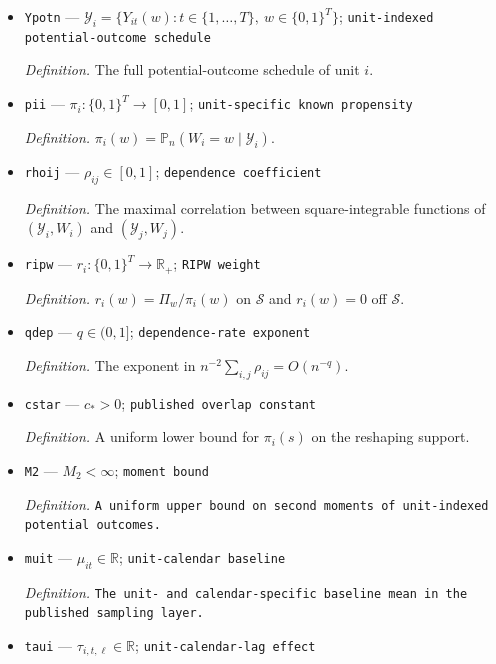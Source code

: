\documentclass{article}
\begin{document}
\begin{itemize}
  \par\smallskip\noindent\emph{Definition.} The observed outcome path of unit \(i\), with \(Y_{it}=Y_{it}(W_i)\).
  \item \texttt{Ypotn} --- \(\mathscr Y_i=\{Y_{it}(w):t\in\{1,\ldots,T\},\ w\in\{0,1\}^{T}\}\); \texttt{unit-\allowbreak{}indexed potential-\allowbreak{}outcome schedule}
  \par\smallskip\noindent\emph{Definition.} The full potential-outcome schedule of unit \(i\).
  \item \texttt{pii} --- \(\pi_i:\{0,1\}^{T}\to[0,1]\); \texttt{unit-\allowbreak{}specific known propensity}
  \par\smallskip\noindent\emph{Definition.} \(\pi_i(w)=\mathbb P_n(W_i=w\mid\mathscr Y_i)\).
  \item \texttt{rhoij} --- \(\rho_{ij}\in[0,1]\); \texttt{dependence coefficient}
  \par\smallskip\noindent\emph{Definition.} The maximal correlation between square-integrable functions of \((\mathscr Y_i,W_i)\) and \((\mathscr Y_j,W_j)\).
  \item \texttt{ripw} --- \(r_i:\{0,1\}^{T}\to\mathbb R_+\); \texttt{RIPW weight}
  \par\smallskip\noindent\emph{Definition.} \(r_i(w)=\Pi_w/\pi_i(w)\) on \(\mathcal S\) and \(r_i(w)=0\) off \(\mathcal S\).
  \item \texttt{qdep} --- \(q\in(0,1]\); \texttt{dependence-\allowbreak{}rate exponent}
  \par\smallskip\noindent\emph{Definition.} The exponent in \(n^{-2}\sum_{i,j}\rho_{ij}=O(n^{-q})\).
  \item \texttt{cstar} --- \(c_{*}>0\); \texttt{published overlap constant}
  \par\smallskip\noindent\emph{Definition.} A uniform lower bound for \(\pi_i(s)\) on the reshaping support.
  \item \texttt{M2} --- \(M_2<\infty\); \texttt{moment bound}
  \par\smallskip\noindent\emph{Definition.} \texttt{A uniform upper bound on second moments of unit-\allowbreak{}indexed potential outcomes.}
  \item \texttt{muit} --- \(\mu_{it}\in\mathbb R\); \texttt{unit-\allowbreak{}calendar baseline}
  \par\smallskip\noindent\emph{Definition.} \texttt{The unit-\allowbreak{} and calendar-\allowbreak{}specific baseline mean in the published sampling layer.}
  \item \texttt{taui} --- \(\tau_{i,t,\ell}\in\mathbb R\); \texttt{unit-\allowbreak{}calendar-\allowbreak{}lag effect}

\end{itemize}
\end{document}
